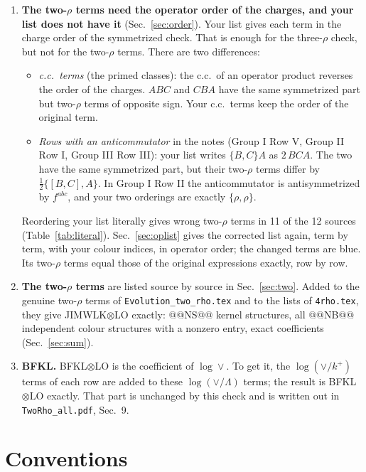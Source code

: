 \documentclass[10pt]{article}
\numberwithin{equation}{section}
\begin{document}
\begin{enumerate}
\item \textbf{The two-$\rho$ terms need the operator order of the charges, and your list does not have it} (Sec.~\ref{sec:order}). Your list gives each term in the charge order of the symmetrized check. That is enough for the three-$\rho$ check, but not for the two-$\rho$ terms. There are two differences:
\begin{itemize}
\item[(a)] \emph{c.c.\ terms} (the primed classes): the c.c.\ of an operator product reverses the order of the charges. $ABC$ and $CBA$ have the same symmetrized part but two-$\rho$ terms of opposite sign. Your c.c.\ terms keep the order of the original term.
\item[(b)] \emph{Rows with an anticommutator} in the notes (Group I Row V, Group II Row I, Group III Row III): your list writes $\{B,C\}A$ as $2\,BCA$. The two have the same symmetrized part, but their two-$\rho$ terms differ by $\tfrac12\{[B,C],A\}$. In Group I Row II the anticommutator is antisymmetrized by $f^{abc}$, and your two orderings are exactly $\{\rho,\rho\}$.
\end{itemize}
Reordering your list literally gives wrong two-$\rho$ terms in 11 of the 12 sources (Table~\ref{tab:literal}). Sec.~\ref{sec:oplist} gives the corrected list again, term by term, with your colour indices, in operator order; the changed terms are blue. Its two-$\rho$ terms equal those of the original expressions exactly, row by row.
\item \textbf{The two-$\rho$ terms} are listed source by source in Sec.~\ref{sec:two}. Added to the genuine two-$\rho$ terms of \texttt{Evolution\_two\_rho.tex} and to the lists of \texttt{4rho.tex}, they give JIMWLK$\otimes$LO exactly: @@NS@@ kernel structures, all @@NB@@ independent colour structures with a nonzero entry, exact coefficients (Sec.~\ref{sec:sum}).
\item \textbf{BFKL.} BFKL$\otimes$LO is the coefficient of $\log\vee$. To get it, the $\log(\vee/k^+)$ terms of each row are added to these $\log(\vee/\Lambda)$ terms; the result is BFKL$\otimes$LO exactly. That part is unchanged by this check and is written out in \texttt{TwoRho\_all.pdf}, Sec.~9.
\end{enumerate}

\section{Conventions}\label{sec:conv}
\end{document}
